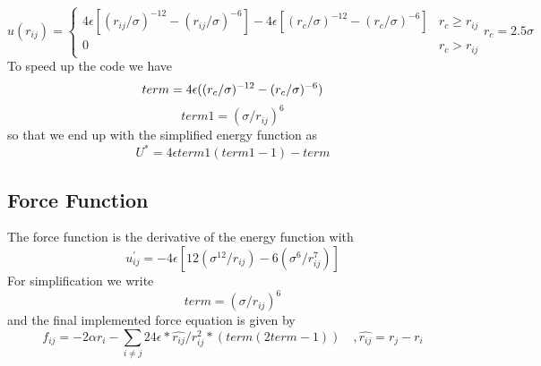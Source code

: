 \documentclass{scrartcl}
\begin{document}
\begin{equation}
    u(r_{ij}) = \left\{
                \begin{array}{ll}
                    4\epsilon[(r_{ij}/\sigma)^{-12} - (r_{ij}/\sigma)^{-6}] - 4\epsilon[(r_{c}/\sigma)^{-12} - (r_{c}/\sigma)^{-6}] &  r_{c} \geq r_{ij} \\
                    0 & r_{c} > r_{ij}  
                \end{array}
                r_{c} = 2.5\sigma
\right.
\end{equation}
To speed up the code we have
\begin{equation}
    term = 4\epsilon((r_{c}/\sigma)^{-12} - (r_{c}/\sigma)^{-6}) \\
\end{equation}
\begin{equation}
    term1 = (\sigma/r_{ij})^{6}
\end{equation}
so that we end up with the simplified energy function as
\begin{equation}
    U^{*} = 4\epsilon term1(term1-1)-term
\end{equation}

\subsection{Force Function}
\par The force function is the derivative of the energy function with 
\begin{equation}
    u_{ij}^{'} = -4\epsilon[12 (\sigma^{12}/r_{ij}) - 6 (\sigma^{6}/r_{ij}^{7})]
\end{equation}
For simplification we write 
\begin{equation}
    term = (\sigma/r_{ij})^{6}
\end{equation}
and the final implemented force equation is given by
\begin{equation}
    f_{ij} = -2\alpha r_{i}  -  \sum_{i\ne j} 24\epsilon * \hat{r_{ij}}/r_{ij}^{2} *(term(2term-1)) \quad, \hat{r_{ij}} = r_{j} -r_{i}
\end{equation}
\end{document}
